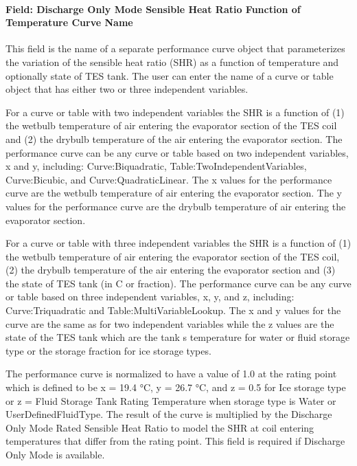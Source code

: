 \paragraph{Field: Discharge Only Mode Sensible Heat Ratio Function of Temperature Curve Name}\label{field-discharge-only-mode-sensible-heat-ratio-function-of-temperature-curve-name}

This field is the name of a separate performance curve object that parameterizes the variation of the sensible heat ratio (SHR) as a function of temperature and optionally state of TES tank. The user can enter the name of a curve or table object that has either two or three independent variables.

For a curve or table with two independent variables the SHR is a function of (1) the wetbulb temperature of air entering the evaporator section of the TES coil and (2) the drybulb temperature of the air entering the evaporator section. The performance curve can be any curve or table based on two independent variables, x and y, including: Curve:Biquadratic, Table:TwoIndependentVariables, Curve:Bicubic, and Curve:QuadraticLinear. The x values for the performance curve are the wetbulb temperature of air entering the evaporator section. The y values for the performance curve are the drybulb temperature of air entering the evaporator section.

For a curve or table with three independent variables the SHR is a function of (1) the wetbulb temperature of air entering the evaporator section of the TES coil, (2) the drybulb temperature of the air entering the evaporator section and (3) the state of TES tank (in C or fraction). The performance curve can be any curve or table based on three independent variables, x, y, and z, including: Curve:Triquadratic and Table:MultiVariableLookup. The x and y values for the curve are the same as for two independent variables while the z values are the state of the TES tank which are the tank s temperature for water or fluid storage type or the storage fraction for ice storage types.

The performance curve is normalized to have a value of 1.0 at the rating point which is defined to be x = 19.4 °C, y = 26.7 °C, and z = 0.5 for Ice storage type or z = Fluid Storage Tank Rating Temperature when storage type is Water or UserDefinedFluidType. The result of the curve is multiplied by the Discharge Only Mode Rated Sensible Heat Ratio to model the SHR at coil entering temperatures that differ from the rating point. This field is required if Discharge Only Mode is available.

